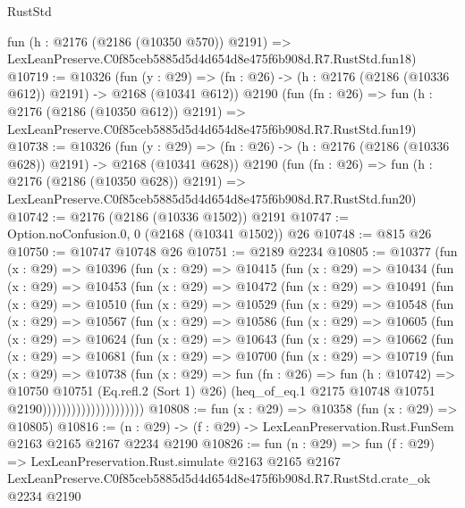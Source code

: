 \begin{lexlean}{RustStd}
\begin{coremodule}
    fun (h : @2176 (@2186 (@10350 @570)) @2191) =>
    LexLeanPreserve.C0f85ceb5885d5d4d654d8e475f6b908d.R7.RustStd.fun18)
@10719 := @10326
    (fun (y : @29) => (fn : @26) -> (h : @2176 (@2186 (@10336 @612)) @2191) -> @2168 (@10341 @612))
    @2190
    (fun (fn : @26) =>
    fun (h : @2176 (@2186 (@10350 @612)) @2191) =>
    LexLeanPreserve.C0f85ceb5885d5d4d654d8e475f6b908d.R7.RustStd.fun19)
@10738 := @10326
    (fun (y : @29) => (fn : @26) -> (h : @2176 (@2186 (@10336 @628)) @2191) -> @2168 (@10341 @628))
    @2190
    (fun (fn : @26) =>
    fun (h : @2176 (@2186 (@10350 @628)) @2191) =>
    LexLeanPreserve.C0f85ceb5885d5d4d654d8e475f6b908d.R7.RustStd.fun20)
@10742 := @2176 (@2186 (@10336 @1502)) @2191
@10747 := Option.noConfusion.{0, 0} (@2168 (@10341 @1502)) @26
@10748 := @815 @26
@10750 := @10747 @10748 @26
@10751 := @2189 @2234
@10805 := @10377
    (fun (x : @29) =>
    @10396
      (fun (x : @29) =>
      @10415
        (fun (x : @29) =>
        @10434
          (fun (x : @29) =>
          @10453
            (fun (x : @29) =>
            @10472
              (fun (x : @29) =>
              @10491
                (fun (x : @29) =>
                @10510
                  (fun (x : @29) =>
                  @10529
                    (fun (x : @29) =>
                    @10548
                      (fun (x : @29) =>
                      @10567
                        (fun (x : @29) =>
                        @10586
                          (fun (x : @29) =>
                          @10605
                            (fun (x : @29) =>
                            @10624
                              (fun (x : @29) =>
                              @10643
                                (fun (x : @29) =>
                                @10662
                                  (fun (x : @29) =>
                                  @10681
                                    (fun (x : @29) =>
                                    @10700
                                      (fun (x : @29) =>
                                      @10719
                                        (fun (x : @29) =>
                                        @10738
                                          (fun (x : @29) =>
                                          fun (fn : @26) =>
                                          fun (h : @10742) =>
                                          @10750
                                            @10751
                                            (Eq.refl.{2} (Sort 1) @26)
                                            (heq_of_eq.{1}
                                              @2175
                                              @10748
                                              @10751
                                              @2190)))))))))))))))))))))
@10808 := fun (x : @29) => @10358 (fun (x : @29) => @10805)
@10816 := (n : @29) -> (f : @29) -> LexLeanPreservation.Rust.FunSem @2163 @2165 @2167 @2234 @2190
@10826 := fun (n : @29) =>
  fun (f : @29) =>
  LexLeanPreservation.Rust.simulate
    @2163
    @2165
    @2167
    LexLeanPreserve.C0f85ceb5885d5d4d654d8e475f6b908d.R7.RustStd.crate_ok
    @2234
    @2190
\end{coremodule}
\end{lexlean}
